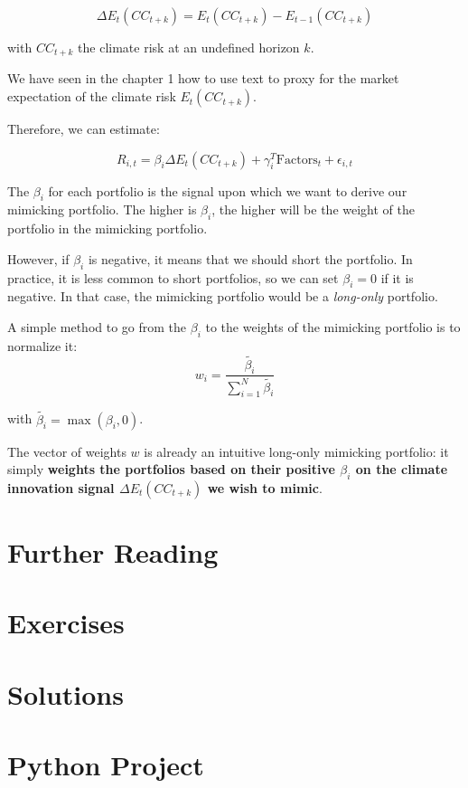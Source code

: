 \begin{equation}
    \Delta E_t (CC_{t+k}) = E_t (CC_{t+k}) - E_{t-1} (CC_{t+k})
\end{equation}

with $CC_{t+k}$ the climate risk at an undefined horizon $k$.

We have seen in the chapter 1 how to use text to proxy for 
the market expectation of the climate risk $E_t(CC_{t+k})$.

Therefore, we can estimate:

\begin{equation}
    R_{i,t} = \beta_i \Delta E_t(CC_{t+k}) + \gamma_i^T \text{Factors}_t + \epsilon_{i,t}
\end{equation}

The $\beta_i$ for each portfolio is the signal 
upon which we want to derive our mimicking portfolio.
The higher is $\beta_i$, the higher will be the weight 
of the portfolio in the mimicking portfolio.

However, if $\beta_i$ is negative, it means that
we should short the portfolio. In practice, 
it is less common to short portfolios, so we
can set $\beta_i = 0$ if it is negative. In that 
case, the mimicking portfolio would be a \textit{long-only}
portfolio.

A simple method to go from the $\beta_i$ to the
weights of the mimicking portfolio is to normalize it:
\begin{equation}
    w_i = \frac{\tilde{\beta_i}}{\sum_{i=1}^{N} \tilde{\beta_i}}
\end{equation}

with $\tilde{\beta_i} = \max(\beta_i, 0)$.

The vector of weights $w$ is already an intuitive 
long-only mimicking portfolio: it simply 
\textbf{weights the portfolios based on their positive 
$\beta_i$ on the climate innovation signal 
$\Delta E_t(CC_{t+k})$ we wish to mimic}.
 

\section{Further Reading}

\section{Exercises}

\section{Solutions}

\section{Python Project}